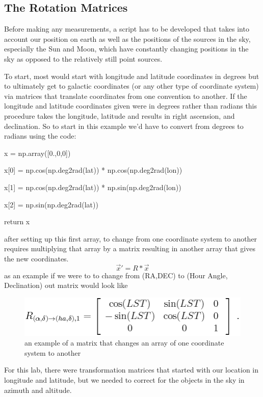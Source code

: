 \documentclass[12 pt]{article}
\begin{document}
\subsection*{The Rotation Matrices}
Before making any measurements, a script has to be developed that takes
into account our position on earth as well as the positions of the
sources in the sky, especially the Sun and Moon, which have constantly
changing positions in the sky as opposed to the relatively still point
sources. \par
To start, most would start with longitude and latitude coordinates in
degrees but to ultimately get to  galactic coordinates (or any other
type of coordinate system) via matrices that
translate coordinates from one convention to another. If the
longitude and latitude coordinates given were in degrees rather than
radians this
procedure takes the longitude, latitude and results in right ascension,
and declination. So to
start in this example we'd have to convert from degrees to radians using the code: \par
\begin{center}
x = np.array([0.,0,0]) \par
x[0] = np.cos(np.deg2rad(lat)) * np.cos(np.deg2rad(lon)) \par
x[1] = np.cos(np.deg2rad(lat)) * np.sin(np.deg2rad(lon)) \par
x[2] = np.sin(np.deg2rad(lat)) \par
return x \par
\end{center}
after setting up this first array, to change from one coordinate system
to another requires multiplying that array by a matrix resulting in
another array that gives the new coordinates. 
\begin{equation}
  \vec{x}' = R*\vec{x}
\end{equation}
as an example if we were to to change from (RA,DEC) to (Hour Angle,
Declination) out matrix would look like

\begin{figure}[H]
\centering
\includegraphics[scale=0.6]{Rmatrix.png}
\caption{an example of a matrix that changes an array of one coordinate
  system to another}
\label{Rmatrix}
\end{figure} 
For this lab, there were transformation matrices that started with our
location in longitude and latitude, but we needed to correct for the
objects in the sky in azimuth and altitude. 
\end{document}

